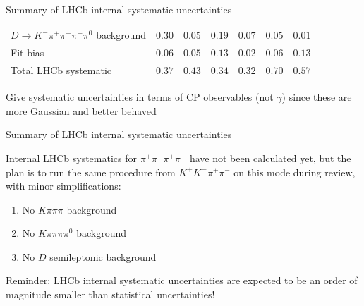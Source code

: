 \documentclass{beamer}
\begin{document}
\begin{frame}{Summary of LHCb internal systematic uncertainties}
\begin{center}
\begin{tabular}{lcccccc}
        $D\to K^-\pi^+\pi^-\pi^+\pi^0$ background                  & $0.30$ & $0.05$ & $0.19$ & $0.07$ & $0.05$ & $0.01$ \\
        Fit bias                                                   & $0.06$ & $0.05$ & $0.13$ & $0.02$ & $0.06$ & $0.13$ \\
        \hline
        Total LHCb systematic                                      & $0.37$ & $0.43$ & $0.34$ & $0.32$ & $0.70$ & $0.57$ \\
        \hline
    \end{tabular}
  \end{center}
  \begin{center}
    {\normalsize Give systematic uncertainties in terms of CP observables (not $\gamma$) since these are more Gaussian and better behaved}
  \end{center}
\end{frame}

\begin{frame}{Summary of LHCb internal systematic uncertainties}
  \begin{center}
    Internal LHCb systematics for $\pi^+\pi^-\pi^+\pi^-$ have not been calculated yet, but the plan is to run the same procedure from $K^+K^-\pi^+\pi^-$ on this mode during review, with minor simplifications:
  \end{center}
  \begin{enumerate}
    \setlength\itemsep{1.5em}
    \item{No $K\pi\pi\pi$ background}
    \item{No $K\pi\pi\pi\pi^0$ background}
    \item{No $D$ semileptonic background}
  \end{enumerate}
  \vspace{0.2cm}
  \begin{center}
    Reminder: LHCb internal systematic uncertainties are expected to be an order of magnitude smaller than statistical uncertainties!
  \end{center}
\end{frame}
\end{document}

